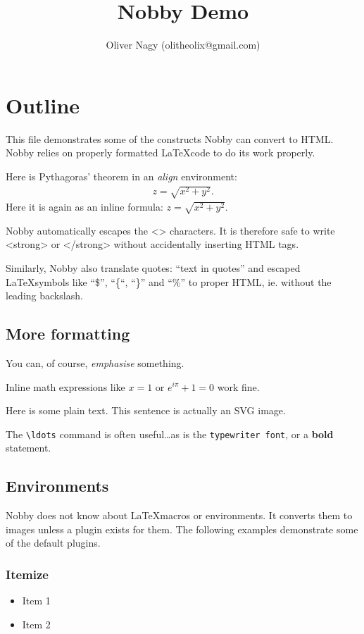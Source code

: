 \documentclass[10pt]{article}
\title{Nobby Demo}
\author{Oliver Nagy (olitheolix@gmail.com)}
\begin{document}
\maketitle

\section{Outline}
\label{sec:one}
This file demonstrates some of the constructs Nobby can convert to
HTML. Nobby relies on properly formatted \LaTeX code to do its work
properly.

Here is Pythagoras' theorem in an \emph{align} environment:
\begin{align}
  \label{eq:pyth}
  z = \sqrt{x^2 + y^2}.
\end{align}
Here it is again as an inline formula: $z = \sqrt{x^2 + y^2}$.

Nobby automatically escapes the <> characters. It is therefore safe to
write <strong> or </strong> without accidentally inserting HTML tags.

Similarly, Nobby also translate quotes: ``text in quotes'' and
escaped \LaTeX symbols like ``\$'', ``\{``, ``\}'' and ``\%'' to
proper HTML, ie. without the leading backslash.


\subsection{More formatting}
You can, of course, \emph{emphasise} something.

Inline math expressions like $x=1$ or $e^{i\pi} + 1 = 0$ work fine.

Here is some plain text. {{This sentence is actually an SVG image.}}

The \texttt{\textbackslash{ldots}} command is often useful\ldots as is the
\texttt{typewriter font}, or a \textbf{bold} statement.

\subsection{Environments}
Nobby does not know about \LaTeX macros or environments. It converts
them to images unless a plugin exists for them. The following examples
demonstrate some of the default plugins.

\subsubsection{Itemize}
\begin{itemize}
\item Item 1
\item Item 2
\end{itemize}
\end{document}
